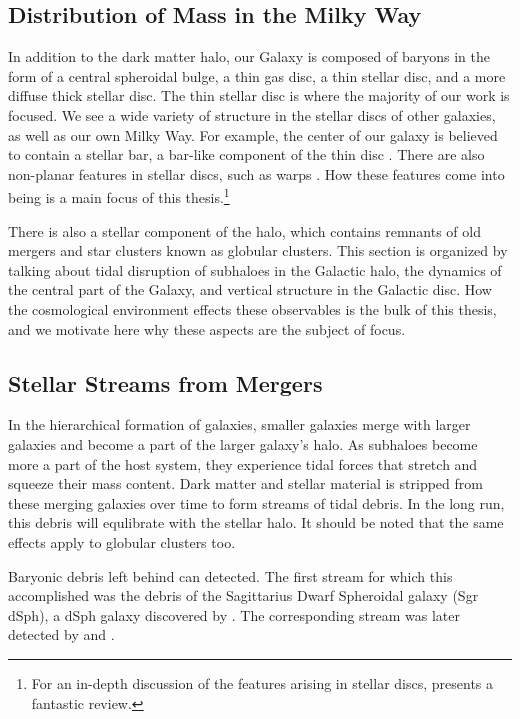 \subsection{Distribution of Mass in the Milky Way}

In addition to the dark matter halo, our Galaxy is composed of baryons in the form of a central spheroidal bulge, a thin gas disc, a thin stellar disc, and a more diffuse thick stellar disc. The thin stellar disc is where the majority of our work is focused. We see a wide variety of structure in the stellar discs of other galaxies, as well as our own Milky Way. For example, the center of our galaxy is believed to contain a stellar bar, a bar-like component of the thin disc \citep{BT}. There are also non-planar features in stellar discs, such as warps \citep{BT}. How these features come into being is a main focus of this thesis.\footnote{For an in-depth discussion of the features arising in stellar discs, \citet{Sellwood2013} presents a fantastic review.}

There is also a stellar component of the halo, which contains remnants of old mergers and star clusters known as globular clusters. This section is organized by talking about tidal disruption of subhaloes in the Galactic halo, the dynamics of the central part of the Galaxy, and vertical structure in the Galactic disc. How the cosmological environment effects these observables is the bulk of this thesis, and we motivate here why these aspects are the subject of focus.

\subsection{Stellar Streams from Mergers}

In the hierarchical formation of galaxies, smaller galaxies merge with larger galaxies and become a part of the larger galaxy's halo. As subhaloes become more a part of the host system, they experience tidal forces that stretch and squeeze their mass content. Dark matter and stellar material is stripped from these merging galaxies over time to form streams of tidal debris. In the long run, this debris will equlibrate with the stellar halo. It should be noted that the same effects apply to globular clusters too.

Baryonic debris left behind can detected. The first stream for which this accomplished was the debris of the Sagittarius Dwarf Spheroidal galaxy (Sgr dSph), a dSph galaxy discovered by \citet{ibata_discovery}. The corresponding stream was later detected by \citet{newberg_2002} and \citet{majewski_2003}. 


